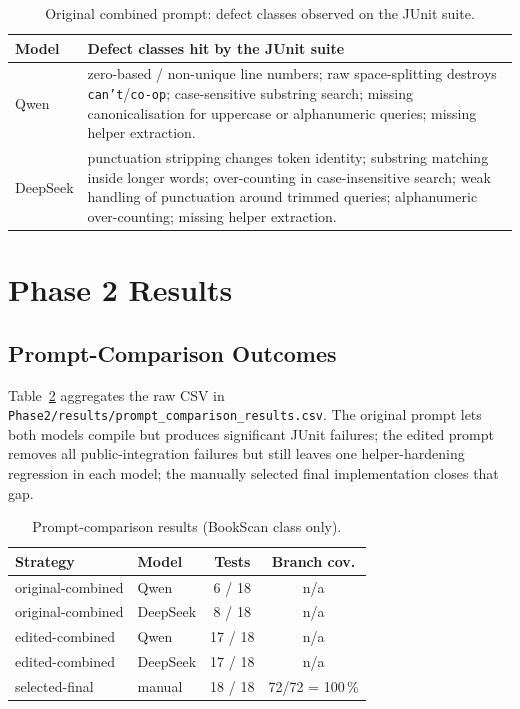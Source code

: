 \documentclass[journal]{IEEEtran}
\begin{document}
\begin{table}[!t]
\renewcommand{\arraystretch}{1.15}
\caption{Original combined prompt: defect classes observed on the JUnit suite.}
\label{tab:failure-modes}
\centering
\footnotesize
\begin{tabular}{@{}lp{14.5cm}@{}}
\toprule
\textbf{Model} & \textbf{Defect classes hit by the JUnit suite} \\
\midrule
Qwen     & zero-based / non-unique line numbers; raw space-splitting destroys \texttt{can't}/\texttt{co-op}; case-sensitive substring search; missing canonicalisation for uppercase or alphanumeric queries; missing helper extraction. \\
DeepSeek & punctuation stripping changes token identity; substring matching inside longer words; over-counting in case-insensitive search; weak handling of punctuation around trimmed queries; alphanumeric over-counting; missing helper extraction. \\
\bottomrule
\end{tabular}
\end{table}

\section{Phase 2 Results}\label{sec:phase2-results}

\subsection{Prompt-Comparison Outcomes}

Table~\ref{tab:phase2-cmp} aggregates the raw CSV in
\texttt{Phase2/results/prompt\_comparison\_results.csv}. The original
prompt lets both models compile but produces significant JUnit failures;
the edited prompt removes all public-integration failures but still leaves
one helper-hardening regression in each model; the manually selected
final implementation closes that gap.

\begin{table}[!t]
\renewcommand{\arraystretch}{1.15}
\caption{Prompt-comparison results (BookScan class only).}
\label{tab:phase2-cmp}
\centering
\footnotesize
\begin{tabular}{@{}llcc@{}}
\toprule
\textbf{Strategy} & \textbf{Model} & \textbf{Tests} & \textbf{Branch cov.} \\
\midrule
original-combined & Qwen     & 6 / 18  & n/a \\
original-combined & DeepSeek & 8 / 18  & n/a \\
edited-combined   & Qwen     & 17 / 18 & n/a \\
edited-combined   & DeepSeek & 17 / 18 & n/a \\
selected-final    & manual   & 18 / 18 & 72/72 = 100\,\% \\
\bottomrule
\end{tabular}
\end{table}
\end{document}
